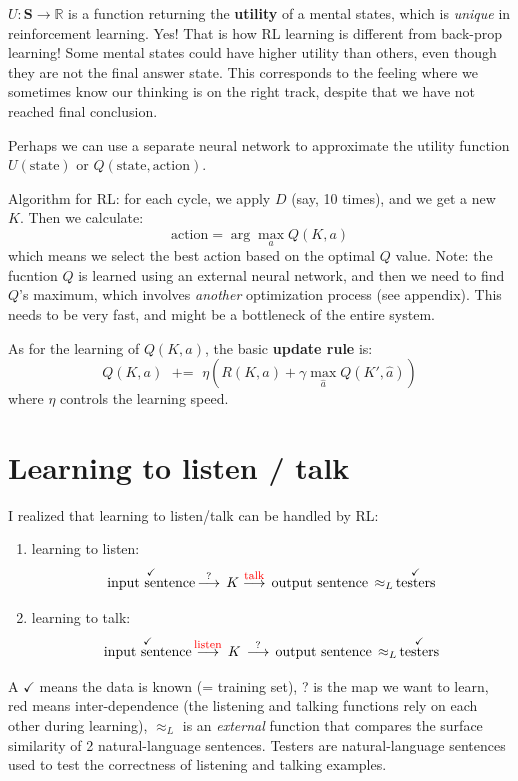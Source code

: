 \documentclass[12pt]{article}
\begin{document}
$ U: \mathbf{S} \rightarrow \mathbb{R} $ is a function returning the \textbf{utility} of a mental states, which is \textit{unique} in reinforcement learning.  Yes! That is how RL learning is different from back-prop learning!  Some mental states could have higher utility than others, even though they are not the final answer state.  This corresponds to the feeling where we sometimes know our thinking is on the right track, despite that we have not reached final conclusion.

Perhaps we can use a separate neural network to approximate the utility function $U(\mbox{state})$ or $Q(\mbox{state},\mbox{action})$.

Algorithm for RL:  for each cycle, we apply $D$ (say, 10 times), and we get a new $K$.  Then we calculate:
$$ \mbox{action} = \arg\max_a Q(K,a) $$
which means we select the best action based on the optimal $Q$ value.  Note:  the fucntion $Q$ is learned using an external neural network, and then we need to find $Q$'s maximum, which involves \textit{another} optimization process (see appendix).  This needs to be very fast, and might be a bottleneck of the entire system.

As for the learning of $Q(K,a)$, the basic \textbf{update rule} is:
$$ Q(K,a) \;\mbox{ += }\; \eta (R(K,a) + \gamma \max_{\hat{a}} Q(K',\hat{a})) $$
where $\eta$ controls the learning speed.

\section{Learning to listen / talk}
\label{sec:learning-to-listen-talk}

I realized that learning to listen/talk can be handled by RL:

\begin{enumerate}
\item learning to listen:
$$ \stackrel{\checkmark}{\mbox{input sentence}} \, \stackrel{?}{\longrightarrow} \, K \stackrel{{\color{red}\mbox{\footnotesize talk}}}{\longrightarrow} \, \mbox{output sentence} \, \approx_L \, \stackrel{\checkmark}{\mbox{testers}} $$
\item learning to talk:
$$ \stackrel{\checkmark}{\mbox{input sentence}} \, \stackrel{{\color{red}\mbox{\footnotesize listen}}}{\longrightarrow} \, K \, \stackrel{?}{\longrightarrow} \, \mbox{output sentence} \, \approx_L \, \stackrel{\checkmark}{\mbox{testers}} $$
\end{enumerate}

A $\checkmark$ means the data is known (= training set), ? is the map we want to learn, {\color{red}red} means inter-dependence (the listening and talking functions rely on each other during learning), $\approx_L$ is an \textit{external} function that compares the surface similarity of 2 natural-language sentences.  Testers are natural-language sentences used to test the correctness of listening and talking examples.
\end{document}
